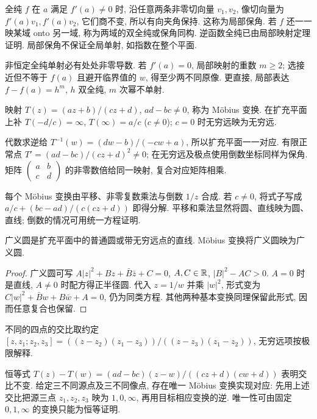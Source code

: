 全纯 $f$ 在 $a$ 满足 $f'(a)\ne0$ 时, 沿任意两条非零切向量 $v_1,v_2$, 像切向量为 $f'(a)v_1,f'(a)v_2$, 它们商不变, 所以有向夹角保持. 这称为局部保角. 若 $f$ 还一一映某域 onto 另一域, 称为两域的双全纯或保角同构. 逆函数全纯已由局部映射定理证明. 局部保角不保证全局单射, 如指数在整个平面.

非恒定全纯单射必有处处非零导数. 若 $f'(a)=0$, 局部映射的重数 $m\ge2$; 选接近但不等于 $f(a)$ 且避开临界值的 $w$, 得至少两不同原像. 更直接, 局部表达 $f-f(a)=h^m$, $h$ 双全纯, $m$ 次幂不单射.

\begin{definition}
映射 $T(z)=(az+b)/(cz+d)$, $ad-bc\ne0$, 称为 Möbius 变换. 在扩充平面上补 $T(-d/c)=\infty$, $T(\infty)=a/c$ ($c\ne0$); $c=0$ 时无穷远映为无穷远.
\end{definition}
代数求逆给 $T^{-1}(w)=(dw-b)/(-cw+a)$, 所以扩充平面一一对应. 有限正常点 $T'=(ad-bc)/(cz+d)^2\ne0$; 在无穷远及极点使用倒数坐标同样为保角. 矩阵 $\begin{pmatrix}a&b\\c&d\end{pmatrix}$ 的非零数倍给同一映射, 复合对应矩阵相乘.

每个 Möbius 变换由平移、非零复数乘法与倒数 $1/z$ 合成. 若 $c\ne0$, 将式子写成 $a/c+(bc-ad)/(c(cz+d))$ 即得分解. 平移和乘法显然将圆、直线映为圆、直线; 倒数的情况可用统一方程证明.
\begin{proposition}
广义圆是扩充平面中的普通圆或带无穷远点的直线. Möbius 变换将广义圆映为广义圆.
\end{proposition}
\begin{proof}
广义圆可写 $A|z|^2+Bz+\bar B\bar z+C=0$, $A,C\in\mathbb R$, $|B|^2-AC>0$. $A=0$ 时是直线, $A\ne0$ 时配方得正半径圆. 代入 $z=1/w$ 并乘 $|w|^2$, 形式变为 $C|w|^2+\bar Bw+B\bar w+A=0$, 仍为同类方程. 其他两种基本变换同理保留此形式, 因而任意复合也保留.
\end{proof}

\begin{definition}
不同的四点的交比取约定 $[z,z_1;z_2,z_3]=((z-z_2)(z_1-z_3))/((z-z_3)(z_1-z_2))$, 无穷远项按极限解释.
\end{definition}
恒等式 $T(z)-T(w)=(ad-bc)(z-w)/((cz+d)(cw+d))$ 表明交比不变. 给定三不同源点及三不同像点, 存在唯一 Möbius 变换实现对应: 先用上述交比把源三点 $z_1,z_2,z_3$ 映为 $1,0,\infty$, 再用目标相应变换的逆. 唯一性可由固定 $0,1,\infty$ 的变换只能为恒等证明.

